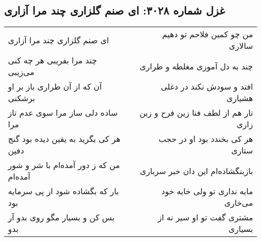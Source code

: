 \begin{center}
\section*{غزل شماره ۳۰۲۸: ای صنم گلزاری چند مرا آزاری}
\label{sec:3028}
\begin{longtable}{l p{0.5cm} r}
ای صنم گلزاری چند مرا آزاری
&&
من چو کمین فلاحم تو دهیم سالاری
\\
چند مرا بفریبی هر چه کنی می‌زیبی
&&
چند به دل آموزی مغلطه و طراری
\\
آن که از آن طراری باز بر او برشکنی
&&
افتد و سودش نکند در دغلی هشیاری
\\
ساده دلی ساز مرا سوی عدم تاز مرا
&&
تار هم از لطف فنا زین فرح و زین زاری
\\
هر کی بگرید به یقین دیده بود گنج دفین
&&
هر کی بخندد بود او در حجب ستاری
\\
من که ز دور آمده‌ام با شر و شور آمده‌ام
&&
بازبنگشاده‌ام این دان خبر سرباری
\\
بار که بگشاده شود از پی سرمایه بود
&&
مایه نداری تو ولی خایه خود می‌خاری
\\
بس کن و بسیار مگو روی بدو آر بدو
&&
مشتری گفت تو او سیر نه از بسیاری
\\
\end{longtable}
\end{center}
